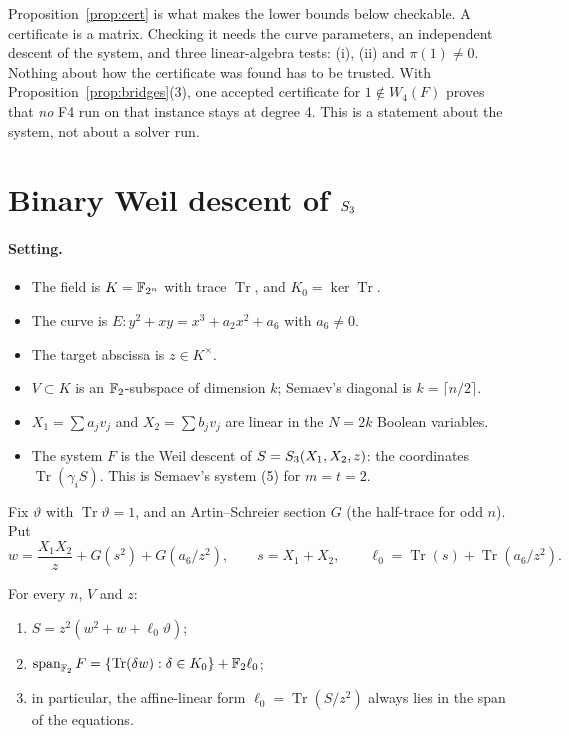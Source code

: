Proposition~\ref{prop:cert} is what makes the lower bounds below
checkable. A certificate is a matrix. Checking it needs the curve
parameters, an independent descent of the system, and three linear-algebra
tests: (i), (ii) and $\pi(1)\ne0$. Nothing about how the certificate was
found has to be trusted. With Proposition~\ref{prop:bridges}(3), one
accepted certificate for $1\notin W_4(F)$ proves that \emph{no} F4 run on
that instance stays at degree 4. This is a statement about the system, not
about a solver run.

\section{Binary Weil descent of $S_{3}$}\label{sec:fd-binary}

\paragraph{Setting.}
\begin{itemize}
\item The field is $K=\mathbb{F}_{2^n}$ with trace $\operatorname{Tr}$, and
  $K_0=\ker\operatorname{Tr}$.
\item The curve is $E:y^2+xy=x^3+a_2x^2+a_6$ with $a_6\ne0$.
\item The target abscissa is $z\in K^\times$.
\item $V\subset K$ is an $\mathbb{F}_2$-subspace of dimension $k$; Semaev's
  diagonal is $k=\lceil n/2\rceil$.
\item $X_1=\sum a_jv_j$ and $X_2=\sum b_jv_j$ are linear in the $N=2k$
  Boolean variables.
\item The system $F$ is the Weil descent of $S=S_{3}(X_1,X_2,z)$: the
  coordinates $\operatorname{Tr}(\gamma_iS)$. This is Semaev's system (5)
  for $m=t=2$.
\end{itemize}
Fix $\vartheta$ with $\operatorname{Tr}\vartheta=1$, and an Artin--Schreier
section $G$ (the half-trace for odd $n$). Put
\[
  w=\frac{X_1X_2}{z}+G(s^2)+G(a_6/z^2),\qquad s=X_1+X_2,\qquad
  \ell_0=\operatorname{Tr}(s)+\operatorname{Tr}(a_6/z^2).
\]

\begin{theorem}\label{thm:reform}
For every $n$, $V$ and $z$:
\begin{enumerate}
\item $S=z^2(w^2+w+\ell_0\vartheta)$;
\item $\operatorname{span}_{\mathbb{F}_2}F=\{\operatorname{Tr}(\delta w):\delta\in K_0\}+\mathbb{F}_2\ell_0$;
\item in particular, the affine-linear form
  $\ell_0=\operatorname{Tr}(S/z^2)$ always lies in the span of the
  equations.
\end{enumerate}
\end{theorem}

